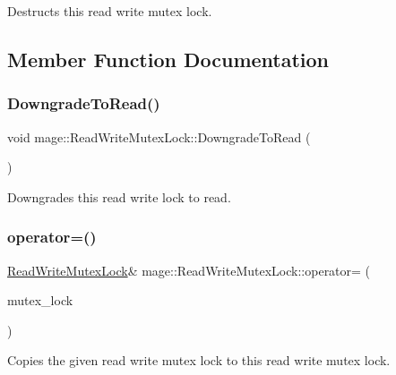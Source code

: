 Destructs this read write mutex lock. 

\subsection{Member Function Documentation}
\hypertarget{classmage_1_1_read_write_mutex_lock_a1300da588c4a0950cca5a3b6a65d5f29}{}\label{classmage_1_1_read_write_mutex_lock_a1300da588c4a0950cca5a3b6a65d5f29} 
\subsubsection{\texorpdfstring{Downgrade\+To\+Read()}{DowngradeToRead()}}
{\footnotesize\ttfamily void mage\+::\+Read\+Write\+Mutex\+Lock\+::\+Downgrade\+To\+Read (\begin{DoxyParamCaption}{ }\end{DoxyParamCaption})\hspace{0.3cm}{\ttfamily [noexcept]}}

Downgrades this read write lock to read. \hypertarget{classmage_1_1_read_write_mutex_lock_ade82a57f337e39a1515f67fbc1f6fc43}{}\label{classmage_1_1_read_write_mutex_lock_ade82a57f337e39a1515f67fbc1f6fc43} 
\subsubsection{\texorpdfstring{operator=()}{operator=()}\hspace{0.1cm}{\footnotesize\ttfamily [1/2]}}
{\footnotesize\ttfamily \hyperlink{classmage_1_1_read_write_mutex_lock}{Read\+Write\+Mutex\+Lock}\& mage\+::\+Read\+Write\+Mutex\+Lock\+::operator= (\begin{DoxyParamCaption}\item[{const \hyperlink{classmage_1_1_read_write_mutex_lock}{Read\+Write\+Mutex\+Lock} \&}]{mutex\+\_\+lock }\end{DoxyParamCaption})\hspace{0.3cm}{\ttfamily [delete]}}

Copies the given read write mutex lock to this read write mutex lock.


